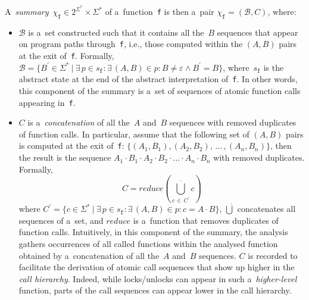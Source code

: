 A~\emph{summary}~$ \chi_\mathtt{f} \in 2^{\Sigma^*} \times \Sigma^* $ of
a~function~\texttt{f} is then a~pair $ \chi_\mathtt{f} = (\mathcal{B},
C) $, where:
\begin{itemize}
    \item $ \mathcal{B} $ is a~set constructed such that it contains all the~$ B $ sequences that appear on program paths through~\texttt{f}, i.e., those computed within the $ (A, B) $ pairs at the exit of~\texttt{f}. Formally, $ \mathcal{B} = \{B^\prime \in \Sigma^*\ |\ \exists\,p \in s_\mathtt{f} : \exists\,(A, B) \in p : B \neq \varepsilon \wedge B^\prime = B\} $, where~$ s_\mathtt{f} $ is the abstract state at the end of the abstract interpretation of~\texttt{f}. In other words, this component of the summary is a~set of sequences of atomic function calls appearing in~\texttt{f}.

    \item $ C $ is a~\emph{concatenation} of all the~$ A $ and~$ B $ sequences with removed duplicates of function calls. In particular, assume that the following set of $ (A, B) $ pairs is computed at the exit of~\texttt{f}: $ \{(A_1, B_1), (A_2, B_2),\,\ldots\,, (A_n, B_n)\} $, then the result is the sequence $ A_1 \cdot B_1 \cdot A_2 \cdot B_2 \cdot \ldots \cdot A_n \cdot B_n $ with removed duplicates. Formally,
        $$
            C = reduce(\bigcup\limits_{c\,\in\,C^\prime}^\cdot c)
        $$
        where $ C^\prime = \{c \in \Sigma^*\ |\ \exists\,p \in s_\mathtt{f} : \exists\,(A, B) \in p: c = A \cdot B\} $, $ \dot\bigcup $ concatenates all sequences of a~set, and $ reduce $ is a~function that removes duplicates of function calls. Intuitively, in this component of the summary, the analysis gathers occurrences of all called functions within the analysed function obtained by a~concatenation of all the~$ A $ and~$ B $ sequences. $ C $ is recorded to facilitate the derivation of atomic call sequences that show up higher in the \emph{call hierarchy}. Indeed, while locks/unlocks can appear in such a~\emph{higher-level} function, parts of the call sequences can appear lower in the call hierarchy.
\end{itemize}

